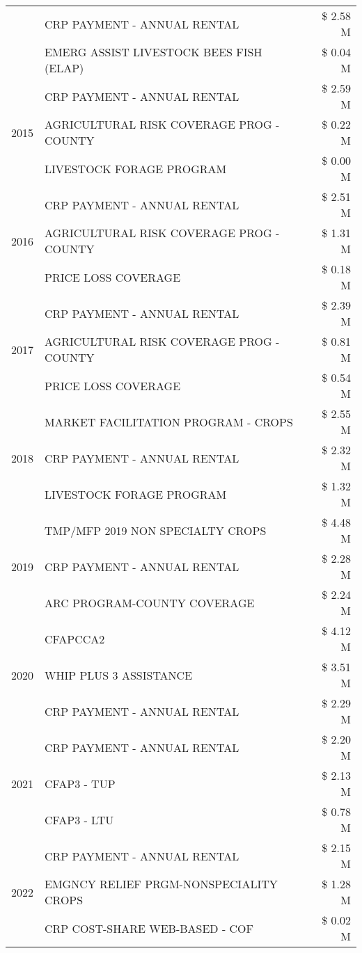 \begin{tabular}{llr}
 & CRP PAYMENT - ANNUAL RENTAL & \$ 2.58 M \\
 & EMERG ASSIST LIVESTOCK BEES FISH (ELAP) & \$ 0.04 M \\
\cline{1-3}
\multirow[t]{3}{*}{2015} & CRP PAYMENT - ANNUAL RENTAL & \$ 2.59 M \\
 & AGRICULTURAL RISK COVERAGE PROG - COUNTY & \$ 0.22 M \\
 & LIVESTOCK FORAGE PROGRAM & \$ 0.00 M \\
\cline{1-3}
\multirow[t]{3}{*}{2016} & CRP PAYMENT - ANNUAL RENTAL & \$ 2.51 M \\
 & AGRICULTURAL RISK COVERAGE PROG - COUNTY & \$ 1.31 M \\
 & PRICE LOSS COVERAGE & \$ 0.18 M \\
\cline{1-3}
\multirow[t]{3}{*}{2017} & CRP PAYMENT - ANNUAL RENTAL & \$ 2.39 M \\
 & AGRICULTURAL RISK COVERAGE PROG - COUNTY & \$ 0.81 M \\
 & PRICE LOSS COVERAGE & \$ 0.54 M \\
\cline{1-3}
\multirow[t]{3}{*}{2018} & MARKET FACILITATION PROGRAM - CROPS & \$ 2.55 M \\
 & CRP PAYMENT - ANNUAL RENTAL & \$ 2.32 M \\
 & LIVESTOCK FORAGE PROGRAM & \$ 1.32 M \\
\cline{1-3}
\multirow[t]{3}{*}{2019} & TMP/MFP 2019 NON SPECIALTY CROPS & \$ 4.48 M \\
 & CRP PAYMENT - ANNUAL RENTAL & \$ 2.28 M \\
 & ARC PROGRAM-COUNTY COVERAGE & \$ 2.24 M \\
\cline{1-3}
\multirow[t]{3}{*}{2020} & CFAPCCA2 & \$ 4.12 M \\
 & WHIP PLUS 3 ASSISTANCE & \$ 3.51 M \\
 & CRP PAYMENT - ANNUAL RENTAL & \$ 2.29 M \\
\cline{1-3}
\multirow[t]{3}{*}{2021} & CRP PAYMENT - ANNUAL RENTAL & \$ 2.20 M \\
 & CFAP3 - TUP & \$ 2.13 M \\
 & CFAP3 - LTU & \$ 0.78 M \\
\cline{1-3}
\multirow[t]{3}{*}{2022} & CRP PAYMENT - ANNUAL RENTAL & \$ 2.15 M \\
 & EMGNCY RELIEF PRGM-NONSPECIALITY CROPS & \$ 1.28 M \\
 & CRP COST-SHARE WEB-BASED - COF & \$ 0.02 M \\
\cline{1-3}
\bottomrule
\end{tabular}
